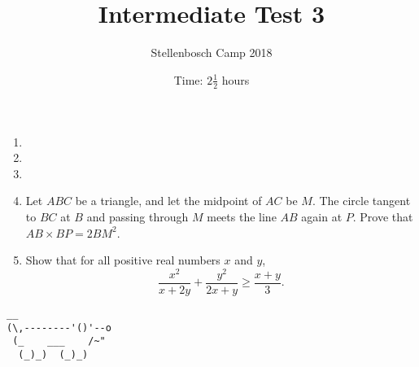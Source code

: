 \documentclass{article}
\title{Intermediate Test 3}
\author{Stellenbosch Camp 2018}
\date{Time: $2\frac{1}{2}$ hours}
\begin{document}
\maketitle

\begin{enumerate}[1.]

\item %


\vspace{12pt}
\item %


\vspace{12pt}
\item %


\vspace{12pt}
\item %
Let $ABC$ be a triangle, and let the midpoint of $AC$ be $M$. The circle tangent to $BC$ at $B$ and passing through $M$ meets the line $AB$ again at $P$. Prove that $AB \times BP = 2 BM^2$.


\vspace{12pt}
\item %
Show that for all positive real numbers $x$ and $y$, \[ \frac{x^2}{x+2y} +\frac{y^2}{2x+y} \geq \frac{x+y}{3}. \] 


\end{enumerate}


\vspace{12pt}
\begin{center}
\begin{BVerbatim}
__
(\,--------'()'--o
 (_    ___    /~"
  (_)_)  (_)_)
\end{BVerbatim}
\end{center}
\end{document}
